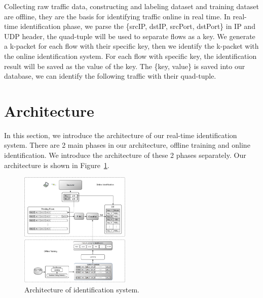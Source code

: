 \documentclass[conference]{IEEEtran}
\begin{document}
Collecting raw traffic data, constructing and labeling dataset and training dataset are offline, they are the basis for identifying traffic online in real time. In real-time identification phase, we parse the \{srcIP, dstIP, srcPort, dstPort\} in IP and UDP header, the quad-tuple will be used to separate flows as a key. We generate a k-packet for each flow with their specific key, then we identify the k-packet with the online identification system. For each flow with specific key, the identification result will be saved as the value of the key. The \{key, value\} is saved into our database, we can identify the following traffic with their quad-tuple.

\section{Architecture}
\label{sec:architecture}
In this section, we introduce the architecture of our real-time identification system. There are 2 main phases in our architecture, offline training and online identification. We introduce the architecture of these 2 phases separately.
Our architecture is shown in Figure~\ref{fig:architecture}.

\begin{figure}[htp]
\begin{center}
\includegraphics[width=0.47\textwidth]{architecture.eps}
\caption{Architecture of identification system.}\label{fig:architecture}
\end{center}
\end{figure}
\end{document}
